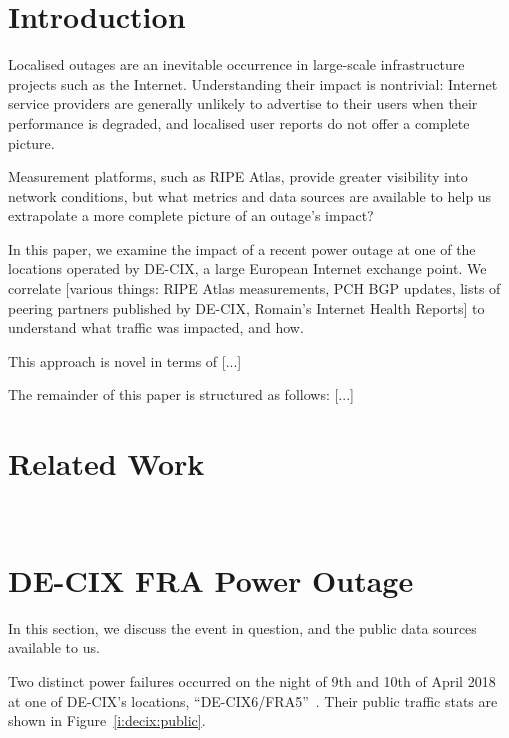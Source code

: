 \section{Introduction}

Localised outages are an inevitable occurrence in large-scale infrastructure
projects such as the Internet. Understanding their impact is nontrivial:
Internet service providers are generally unlikely to advertise to their users
when their performance is degraded, and localised user reports do not offer a
complete picture.

Measurement platforms, such as RIPE Atlas, provide greater visibility into
network conditions, but what metrics and data sources are available to help us
extrapolate a more complete picture of an outage's impact? 

In this paper, we examine the impact of a recent power outage at one of the
locations operated by DE-CIX, a large European Internet exchange point. We
correlate [various things: RIPE Atlas measurements, PCH BGP updates, lists of
peering partners published by DE-CIX, Romain's Internet Health Reports] to
understand what traffic was impacted, and how.

This approach is novel in terms of [...]

The remainder of this paper is structured as follows: [...]

\section{Related Work}

~\cite{labs:damage:2015, labs:damage:2018}


\section{DE-CIX FRA Power Outage}

In this section, we discuss the event in question, and the public data sources
available to us.

Two distinct power failures occurred on the night of 9th and 10th of April 2018
at one of DE-CIX's locations, ``DE-CIX6/FRA5''~\cite{tweet:decix-1, tweet:decix-2}.
Their public traffic stats are shown in Figure~\ref{i:decix:public}.

